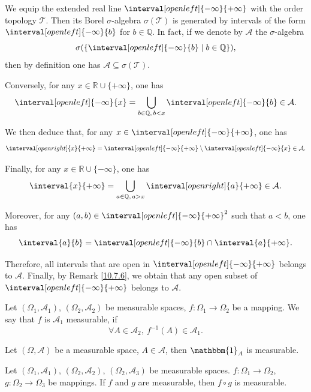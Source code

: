 \begin{exampleenv}
    We equip the extended real line $\interval[open left]{-\infty}{+\infty}$ with the order topology $\mathscr{T}$. Then its Borel $\sigma$-algebra $\sigma(\mathscr{T})$ is generated by intervals of the form $\interval[open left]{-\infty}{b}$ for $b \in \mathbb{Q}$. In fact, if we denote by $\mathcal{A}$ the $\sigma$-algebra
\[
\sigma(\{\interval[open left]{-\infty}{b} \mid b \in \mathbb{Q}\}),
\]
then by definition one has $\mathcal{A} \subseteq \sigma(\mathscr{T})$.

Conversely, for any $x \in \mathbb{R} \cup \{+\infty\}$, one has
\[
\interval[open left]{-\infty}{x} = \bigcup_{b \in \mathbb{Q},\, b < x} \interval[open left]{-\infty}{b} \in \mathcal{A}.
\]

We then deduce that, for any $x \in \interval[open left]{-\infty}{+\infty}$, one has
\[
\interval[open right]{x}{+\infty} = \interval[open left]{-\infty}{+\infty} \setminus \interval[open left]{-\infty}{x} \in \mathcal{A}.
\]

Finally, for any $x \in \mathbb{R} \cup \{-\infty\}$, one has
\[
\interval{x}{+\infty} = \bigcup_{a \in \mathbb{Q},\, a > x} \interval[open right]{a}{+\infty} \in \mathcal{A}.
\]

Moreover, for any $(a, b) \in \interval[open left]{-\infty}{+\infty}^2$ such that $a < b$, one has
\[
\interval{a}{b} = \interval[open left]{-\infty}{b} \cap \interval{a}{+\infty}.
\]

Therefore, all intervals that are open in $\interval[open left]{-\infty}{+\infty}$ belongs to $\mathcal{A}$. Finally, by Remark \ref{10.7.6}, we obtain that any open subset of $\interval[open left]{-\infty}{+\infty}$ belongs to $\mathcal{A}$.
\end{exampleenv}
\begin{definitionenv}
    Let $(\Omega_1,\mathcal{A}_1)$, $(\Omega_2,\mathcal{A}_2)$ be measurable spaces, $f:\Omega_1\longrightarrow \Omega_2$ be a mapping. We say that $f$ is $\mathcal{A}_1$ measurable, if 
    $$ \forall A\in \mathcal{A}_2,\ f^{-1}(A)\in \mathcal{A}_1.$$
\end{definitionenv}
\begin{remark}
    Let $(\Omega,\mathcal{A})$ be a measurable space, $A\in \mathcal{A}$, then $\mathbbm{1}_A$ is measurable.
\end{remark}
\begin{propositionenv}
    Let $(\Omega_1,\mathcal{A}_1)$, $(\Omega_2,\mathcal{A}_2)$, $(\Omega_2,\mathcal{A}_3)$ be measurable spaces. $f:\Omega_1\longrightarrow \Omega_2$, $g:\Omega_2\longrightarrow \Omega_3$ be mappings. If $f$ and $g$ are measurable, then $f\circ g$ is measurable.
\end{propositionenv}
